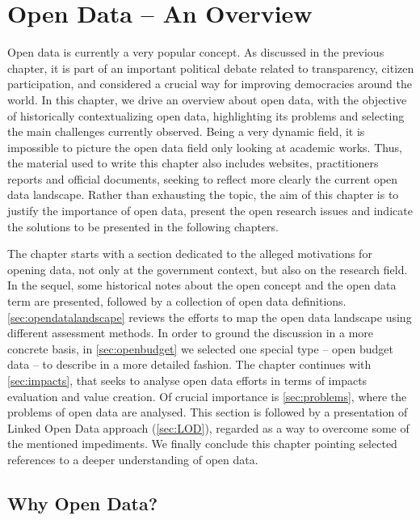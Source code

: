 \chapter{Open Data -- An Overview}
\label{chap:opendata}

Open data is currently a very popular concept.
As discussed in the previous chapter, it is part of an important political debate related to transparency, citizen participation, and considered a crucial way for improving democracies around the world.
In this chapter, we drive an overview about open data, with the objective of historically contextualizing open data, highlighting its problems and selecting the main challenges currently observed.
Being a very dynamic field, it is impossible to picture the open data field only looking at academic works.
Thus, the material used to write this chapter also includes websites, practitioners reports and official documents, seeking to reflect more clearly the current open data landscape.
Rather than exhausting the topic, the aim of this chapter is to justify the importance of open data, present the open research issues and indicate the solutions to be presented in the following chapters.

The chapter starts with a section dedicated to the alleged motivations for opening data, not only at the government context, but also on the research field.
In the sequel, some historical notes about the open concept and the open data term are presented, followed by a collection of open data definitions.
\autoref{sec:opendatalandscape} reviews the efforts to map the open data landscape using different assessment methods.
In order to ground the discussion in a more concrete basis, in \autoref{sec:openbudget} we selected one special type -- open budget data -- to describe in a more detailed fashion.
The chapter continues with \autoref{sec:impacts}, that seeks to analyse open data efforts in terms of impacts evaluation and value creation.
Of crucial importance is \autoref{sec:problems}, where the problems of open data are analysed.
This section is followed by a presentation of Linked Open Data approach (\autoref{sec:LOD}), regarded as a way to overcome some of the mentioned impediments.
We finally conclude this chapter pointing selected references to a deeper understanding of open data. 

\section{Why Open Data?}
\label{sec:why}


